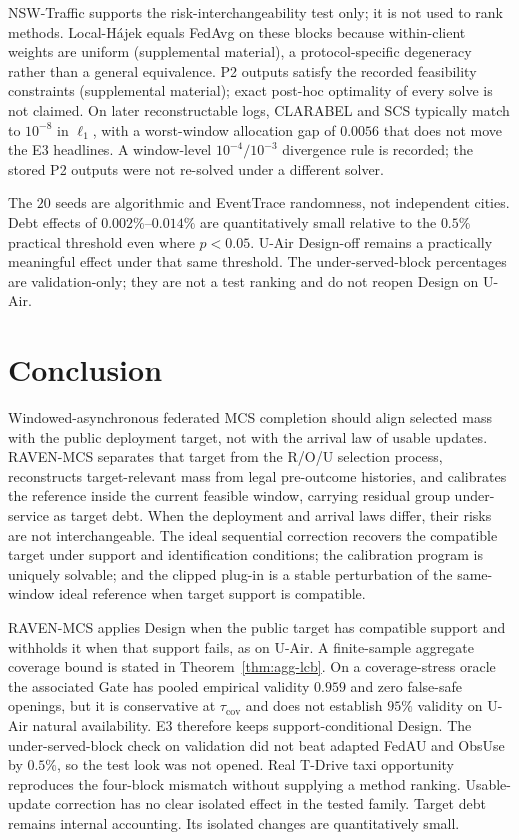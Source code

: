 \documentclass[letterpaper,journal]{IEEEtran}
\begin{document}
NSW-Traffic supports the risk-interchangeability test only; it is not used to rank methods.
Local-H\'ajek equals FedAvg on these blocks because within-client
weights are uniform (supplemental material), a
protocol-specific degeneracy rather than a general equivalence.
P2 outputs satisfy the recorded feasibility constraints
(supplemental material); exact post-hoc optimality of every
solve is not claimed.  On later reconstructable logs, CLARABEL and SCS
typically match to $10^{-8}$ in $\ell_1$, with a worst-window
allocation gap of $0.0056$ that does not move the E3 headlines.  A window-level $10^{-4}/10^{-3}$ divergence rule is
recorded; the stored P2 outputs were not re-solved under a different solver.

The $20$ seeds are algorithmic and EventTrace randomness, not
independent cities.  Debt effects of $0.002\%$--$0.014\%$ are
quantitatively small relative to the $0.5\%$ practical threshold even
where $p<0.05$.  U-Air Design-off remains a practically meaningful
effect under that same threshold.  The under-served-block percentages
are validation-only; they are not a test ranking and do not reopen
Design on U-Air.


\section{Conclusion}
\label{sec:conclusion}

Windowed-asynchronous federated MCS completion should align selected
mass with the public deployment target, not with the arrival law of
usable updates.  RAVEN-MCS separates that target from the R/O/U
selection process, reconstructs target-relevant mass from legal
pre-outcome histories, and calibrates the reference inside the current
feasible window, carrying residual group under-service as target debt.
When the deployment and arrival laws differ, their risks are not
interchangeable.  The ideal sequential correction recovers the
compatible target under support and identification conditions; the
calibration program is uniquely solvable; and the clipped plug-in is a
stable perturbation of the same-window ideal reference when target
support is compatible.

RAVEN-MCS applies Design when the public target has compatible support
and withholds it when that support fails, as on U-Air.  A finite-sample
aggregate coverage bound is stated in Theorem~\ref{thm:agg-lcb}.  On a
coverage-stress oracle the associated Gate has pooled empirical validity
$0.959$ and zero false-safe openings, but it is conservative at
$\tau_{\mathrm{cov}}$ and does not establish $95\%$ validity on U-Air
natural availability.  E3 therefore keeps support-conditional Design.
The under-served-block check on validation did not beat adapted FedAU and
ObsUse by $0.5\%$, so the test look was not opened.  Real T-Drive taxi
opportunity reproduces the four-block mismatch without supplying a method
ranking.  Usable-update correction has no clear isolated effect in the
tested family.  Target debt remains internal accounting.  Its isolated
changes are quantitatively small.
\end{document}
